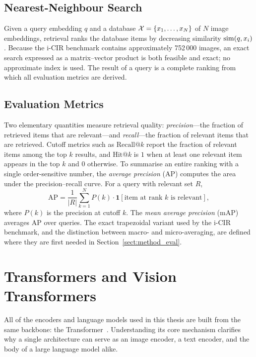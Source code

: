 \subsection{Nearest-Neighbour Search}

Given a query embedding $q$ and a database
$\mathcal{X}=\{x_{1},\dots,x_{N}\}$ of $N$ image embeddings, retrieval ranks the
database items by decreasing similarity $\mathrm{sim}(q,x_{i})$. Because the i-CIR
benchmark contains approximately 752\,000 images, an exact search expressed as a
matrix--vector product is both feasible and exact; no approximate index is used.
The result of a query is a complete ranking from which all evaluation metrics are
derived.

\subsection{Evaluation Metrics}

Two elementary quantities measure retrieval quality: \emph{precision}---the
fraction of retrieved items that are relevant---and \emph{recall}---the fraction
of relevant items that are retrieved. Cutoff metrics such as $\mathrm{Recall}@k$
report the fraction of relevant items among the top $k$ results, and
$\mathrm{Hit}@k$ is $1$ when at least one relevant item appears in the top $k$
and $0$ otherwise. To summarise an entire ranking with a single order-sensitive
number, the \emph{average precision} (AP) computes the area under the
precision--recall curve. For a query with relevant set $R$,
\begin{equation}\label{eq:ap_basic}
  \mathrm{AP}
  = \frac{1}{|R|}\sum_{k=1}^{N}
    P(k)\cdot\mathbf{1}[\text{item at rank }k\text{ is relevant}],
\end{equation}
where $P(k)$ is the precision at cutoff $k$. The \emph{mean average precision}
(mAP) averages AP over queries. The exact trapezoidal variant used by the i-CIR
benchmark, and the distinction between macro- and micro-averaging, are defined
where they are first needed in Section~\ref{sect:method_eval}.

\section{Transformers and Vision Transformers}\label{sect:bg_transformer}

All of the encoders and language models used in this thesis are built from the
same backbone: the Transformer~\cite{vaswani2017attention}. Understanding its
core mechanism clarifies why a single architecture can serve as an image encoder,
a text encoder, and the body of a large language model alike.

